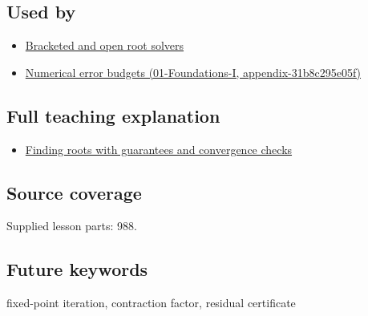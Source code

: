 \subsection{Used by}\label{appendix-d83b0ad1be7f-used-by}

\begin{itemize}
\tightlist
\item
  \hyperref[appendix-f63eb850796d]{Bracketed and open root solvers}
\item
  \href{../01-Foundations-I/main.pdf\#nameddest=appendix-31b8c295e05f}{Numerical error budgets (01-Foundations-I, appendix-31b8c295e05f)}
\end{itemize}

\subsection{Full teaching explanation}\label{appendix-d83b0ad1be7f-full-teaching-explanation}

\begin{itemize}
\tightlist
\item
  \hyperref[02-foundations-ii-ch028-finding-roots-with-guarantees-and-convergence-checks]{Finding roots with guarantees and convergence checks}
\end{itemize}

\subsection{Source coverage}\label{appendix-d83b0ad1be7f-source-coverage}

Supplied lesson parts: 988.

\subsection{Future keywords}\label{appendix-d83b0ad1be7f-future-keywords}

fixed-point iteration, contraction factor, residual certificate
